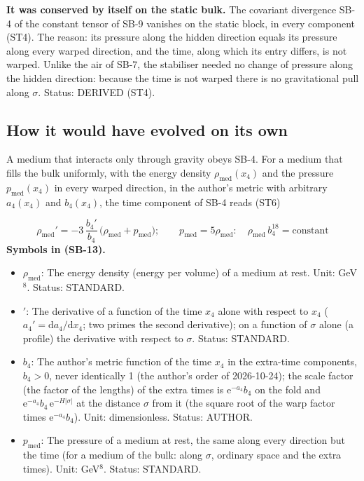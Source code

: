 \documentclass[
  10pt,
]{article}
\providecommand{\tightlist}{%
  \setlength{\itemsep}{0pt}\setlength{\parskip}{0pt}}
\begin{document}
\textbf{It was conserved by itself on the static bulk.} The covariant
divergence SB-4 of the constant tensor of SB-9 vanishes on the static
block, in every component (ST4). The reason: its pressure along the
hidden direction equals its pressure along every warped direction, and
the time, along which its entry differs, is not warped. Unlike the air
of SB-7, the stabiliser needed no change of pressure along the hidden
direction: because the time is not warped there is no gravitational pull
along \(\sigma\). Status: DERIVED (ST4).

\hypertarget{how-it-would-have-evolved-on-its-own}{%
\subsection{How it would have evolved on its
own}\label{how-it-would-have-evolved-on-its-own}}

A medium that interacts only through gravity obeys SB-4. For a medium
that fills the bulk uniformly, with the energy density
\(\rho_{\mathrm{med}}(x_4)\) and the pressure \(p_{\mathrm{med}}(x_4)\)
in every warped direction, in the author's metric with arbitrary
\(a_4(x_4)\) and \(b_4(x_4)\), the time component of SB-4 reads (ST6)

\[
\rho_{\mathrm{med}}' = -3\,\frac{b_4'}{b_4}\,\big(\rho_{\mathrm{med}} + p_{\mathrm{med}}\big);\qquad
p_{\mathrm{med}} = 5\rho_{\mathrm{med}}:\quad \rho_{\mathrm{med}}\,b_4^{18} = \text{constant} \tag{SB-13}
\] \textbf{Symbols in (SB-13).}

\begin{itemize}
\tightlist
\item
  \(\rho_{\mathrm{med}}\): The energy density (energy per volume) of a
  medium at rest. Unit: GeV\(^8\). Status: STANDARD.
\item
  \({}'\): The derivative of a function of the time \(x_4\) alone with
  respect to \(x_4\) (\(a_4' = \mathrm{d}a_4/\mathrm{d}x_4\); two primes
  the second derivative); on a function of \(\sigma\) alone (a profile)
  the derivative with respect to \(\sigma\). Status: STANDARD.
\item
  \(b_4\): The author's metric function of the time \(x_4\) in the
  extra-time components, \(b_4 > 0\), never identically 1 (the author's
  order of 2026-10-24); the scale factor (the factor of the lengths) of
  the extra times is \(\mathrm{e}^{-a_4}b_4\) on the fold and
  \(\mathrm{e}^{-a_4}b_4\,\mathrm{e}^{-H\lvert\sigma\rvert}\) at the
  distance \(\sigma\) from it (the square root of the warp factor times
  \(\mathrm{e}^{-a_4}b_4\)). Unit: dimensionless. Status: AUTHOR.
\item
  \(p_{\mathrm{med}}\): The pressure of a medium at rest, the same along
  every direction but the time (for a medium of the bulk: along
  \(\sigma\), ordinary space and the extra times). Unit: GeV\(^8\).
  Status: STANDARD.
\end{itemize}
\end{document}
